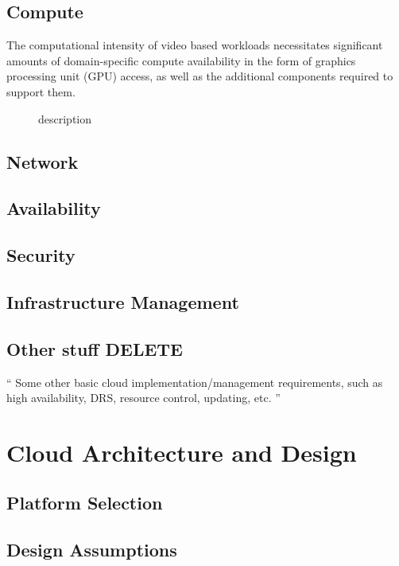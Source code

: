\documentclass[]{article}
\begin{document}
\subsection{Compute}

The computational intensity of video based workloads necessitates significant amounts of domain-specific compute availability in the form of graphics processing unit (GPU) access, as well as the additional components required to support them. 

\begin{description}
    \item[] description
\end{description}

\subsection{Network}

\subsection{Availability}

\subsection{Security}

\subsection{Infrastructure Management}

\subsection{Other stuff DELETE}
`` Some other basic cloud implementation/management requirements, such as high availability, DRS,
resource control, updating, etc. ''

\section{Cloud Architecture and Design}

\subsection{Platform Selection}



\subsection{Design Assumptions}
\end{document}
